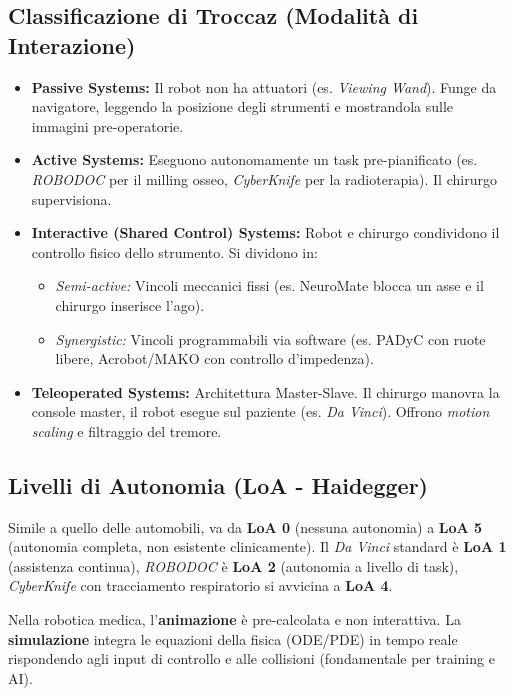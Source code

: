 \documentclass[11pt,a4paper,twoside]{report}
\begin{document}
\subsection{Classificazione di Troccaz (Modalità di Interazione)}
\begin{itemize}
    \item \textbf{Passive Systems:} Il robot non ha attuatori (es. \textit{Viewing Wand}). Funge da navigatore, leggendo la posizione degli strumenti e mostrandola sulle immagini pre-operatorie.
    \item \textbf{Active Systems:} Eseguono autonomamente un task pre-pianificato (es. \textit{ROBODOC} per il milling osseo, \textit{CyberKnife} per la radioterapia). Il chirurgo supervisiona.
    \item \textbf{Interactive (Shared Control) Systems:} Robot e chirurgo condividono il controllo fisico dello strumento. Si dividono in:
    \begin{itemize}
        \item \textit{Semi-active:} Vincoli meccanici fissi (es. NeuroMate blocca un asse e il chirurgo inserisce l'ago).
        \item \textit{Synergistic:} Vincoli programmabili via software (es. PADyC con ruote libere, Acrobot/MAKO con controllo d'impedenza).
    \end{itemize}
    \item \textbf{Teleoperated Systems:} Architettura Master-Slave. Il chirurgo manovra la console master, il robot esegue sul paziente (es. \textit{Da Vinci}). Offrono \textit{motion scaling} e filtraggio del tremore.
\end{itemize}

\subsection{Livelli di Autonomia (LoA - Haidegger)}
Simile a quello delle automobili, va da \textbf{LoA 0} (nessuna autonomia) a \textbf{LoA 5} (autonomia completa, non esistente clinicamente). Il \textit{Da Vinci} standard è \textbf{LoA 1} (assistenza continua), \textit{ROBODOC} è \textbf{LoA 2} (autonomia a livello di task), \textit{CyberKnife} con tracciamento respiratorio si avvicina a \textbf{LoA 4}.

\begin{warningbox}
    Nella robotica medica, l'\textbf{animazione} è pre-calcolata e non interattiva. La \textbf{simulazione} integra le equazioni della fisica (ODE/PDE) in tempo reale rispondendo agli input di controllo e alle collisioni (fondamentale per training e AI).
\end{warningbox}
\end{document}
